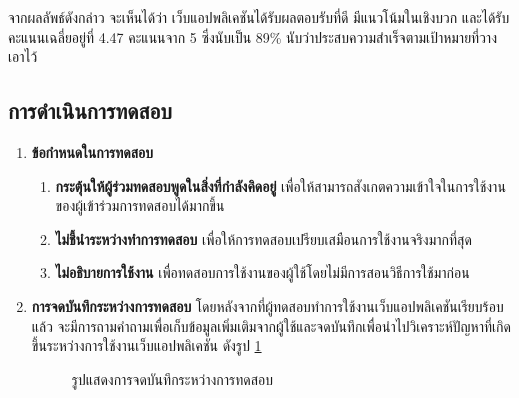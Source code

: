 \begin{enumerate}
          จากผลลัพธ์ดังกล่าว จะเห็นได้ว่า เว็บแอปพลิเคชันได้รับผลตอบรับที่ดี มีแนวโน้มในเชิงบวก และได้รับคะแนนเฉลี่ยอยู่ที่ 4.47 คะแนนจาก 5 ซึ่งนับเป็น 89\%
          นับว่าประสบความสำเร็จตามเป้าหมายที่วางเอาไว้

\end{enumerate}
\subsection{การดำเนินการทดสอบ}
\begin{enumerate}
    \item \textbf{ข้อกำหนดในการทดสอบ}
          \begin{enumerate}
              \item \textbf{กระตุ้นให้ผู้ร่วมทดสอบพูดในสิ่งที่กำลังคิดอยู่} เพื่อให้สามารถสังเกตความเข้าใจในการใช้งานของผู้เข้าร่วมการทดสอบได้มากขึ้น
              \item \textbf{ไม่ชี้นำระหว่างทำการทดสอบ} เพื่อให้การทดสอบเปรียบเสมือนการใช้งานจริงมากที่สุด
              \item \textbf{ไม่อธิบายการใช้งาน} เพื่อทดสอบการใช้งานของผู้ใช้โดยไม่มีการสอนวิธีการใช้มาก่อน
          \end{enumerate}
    \item \textbf{การจดบันทึกระหว่างการทดสอบ} โดยหลังจากที่ผู้ทดสอบทำการใช้งานเว็บแอปพลิเคชันเรียบร้อบแล้ว จะมีการถามคำถามเพื่อเก็บข้อมูลเพิ่มเติมจากผู้ใช้และจดบันทึกเพื่อนำไปวิเคราะห์ปัญหาที่เกิดขึ้นระหว่างการใช้งานเว็บแอปพลิเคชัน ดังรูป \ref{fig:NoteTaking}
          \begin{figure}[H]\centering
              \caption{รูปแสดงการจดบันทึกระหว่างการทดสอบ}\label{fig:NoteTaking}
          \end{figure}
\end{enumerate}
